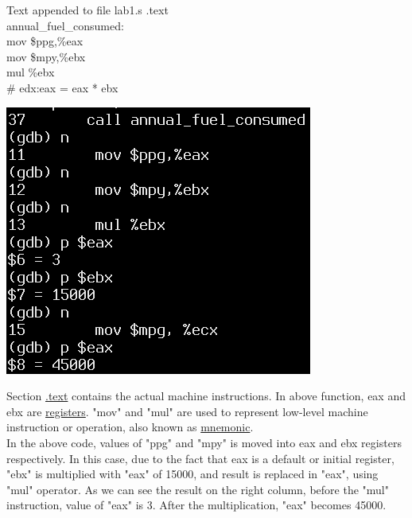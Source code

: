 \documentclass{article}
\begin{document}
\begin{multicols}{2}
\begin{GFT}{Text appended to file lab1.s}
\+.text\\
\+  annual\_fuel\_consumed:\\
\+  mov \$ppg,\%eax \\
\+  mov \$mpy,\%ebx \\
\+  mul \%ebx \\
\+  \# edx:eax = eax * ebx\\
\end{GFT}
\columnbreak
\raggedleft
\includegraphics[scale=0.4]{afc1asm.png}
\end{multicols}
Section \href{http://goo.gl/4czLEp}{.text} contains the actual machine instructions. In above function, eax and ebx are \href{http://whatis.techtarget.com/definition/register}{registers}. "mov" and "mul" are used to represent low-level machine instruction or operation, also known as \href{https://www.techopedia.com/definition/28287/mnemonic}{mnemonic}.\\
In the above code, values of "ppg" and "mpy" is moved into eax and ebx registers respectively. In this case, due to the fact that eax is a default or initial register, "ebx" is multiplied with "eax" of 15000, and result is replaced in "eax", using "mul" operator. As we can see the result on the right column, before the "mul" instruction, value of "eax" is 3. After the multiplication, "eax" becomes 45000. \\
\noindent{\color{red}\rule{\linewidth}{0.5mm}} \\
\end{document}
